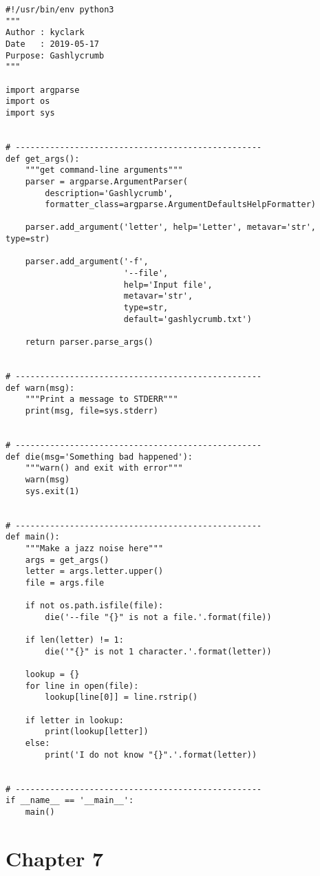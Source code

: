\documentclass[]{article}
\begin{document}
\begin{verbatim}
#!/usr/bin/env python3
"""
Author : kyclark
Date   : 2019-05-17
Purpose: Gashlycrumb
"""

import argparse
import os
import sys


# --------------------------------------------------
def get_args():
    """get command-line arguments"""
    parser = argparse.ArgumentParser(
        description='Gashlycrumb',
        formatter_class=argparse.ArgumentDefaultsHelpFormatter)

    parser.add_argument('letter', help='Letter', metavar='str', type=str)

    parser.add_argument('-f',
                        '--file',
                        help='Input file',
                        metavar='str',
                        type=str,
                        default='gashlycrumb.txt')

    return parser.parse_args()


# --------------------------------------------------
def warn(msg):
    """Print a message to STDERR"""
    print(msg, file=sys.stderr)


# --------------------------------------------------
def die(msg='Something bad happened'):
    """warn() and exit with error"""
    warn(msg)
    sys.exit(1)


# --------------------------------------------------
def main():
    """Make a jazz noise here"""
    args = get_args()
    letter = args.letter.upper()
    file = args.file

    if not os.path.isfile(file):
        die('--file "{}" is not a file.'.format(file))

    if len(letter) != 1:
        die('"{}" is not 1 character.'.format(letter))

    lookup = {}
    for line in open(file):
        lookup[line[0]] = line.rstrip()

    if letter in lookup:
        print(lookup[letter])
    else:
        print('I do not know "{}".'.format(letter))


# --------------------------------------------------
if __name__ == '__main__':
    main()
\end{verbatim}

\pagebreak

\hypertarget{chapter-7}{%
\section{Chapter 7}\label{chapter-7}}
\end{document}
